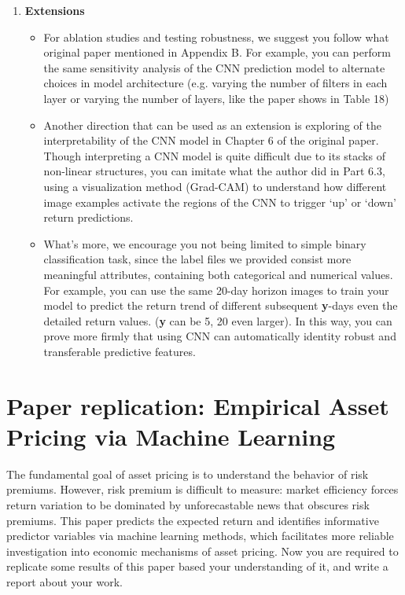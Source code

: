 \documentclass[11pt]{article}
\begin{document}
\begin{enumerate}
\begin{description}
    \end{description}
    
    \item \textbf{Extensions}
    
    \begin{itemize}
        \item For ablation studies and testing robustness, we suggest you follow what original paper mentioned in Appendix B. For example, you can perform the same sensitivity analysis of the CNN prediction model to alternate choices in model architecture (e.g. varying the number of filters in each layer or varying the number of layers, like the paper shows in Table 18) 
        
        \item Another direction that can be used as an extension is exploring of the interpretability of the CNN model in Chapter 6 of the original paper. Though interpreting a CNN model is quite difficult due to its stacks of non-linear structures, you can imitate what the author did in Part 6.3, using a visualization method (Grad-CAM) to understand how different image examples activate the regions of the CNN to trigger `up' or `down' return predictions.
        
        \item What's more, we encourage you not being limited to simple binary classification task, since the label files we provided consist more meaningful attributes, containing both categorical and numerical values. For example, you can use the same 20-day horizon images to train your model to predict the return trend of different subsequent \textbf{y}-days even the detailed return values. (\textbf{y} can be 5, 20 even larger). In this way, you can prove more firmly that using CNN can automatically identity robust and transferable predictive features.
    \end{itemize}

   
\end{enumerate}


\section{Paper replication: Empirical Asset Pricing via Machine Learning}

The fundamental goal of asset pricing is to understand the behavior of risk premiums. However, risk premium is difficult to measure: market efficiency forces return variation to be dominated by unforecastable news that obscures risk premiums. This paper predicts the expected return and identifies informative predictor variables via machine learning methods, which facilitates more reliable investigation into economic mechanisms of asset pricing. Now you are required to replicate some results of this paper based your understanding of it, and write a report about your work.
\end{document}
